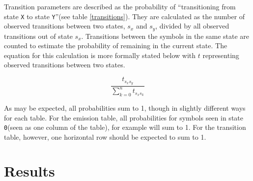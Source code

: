 \documentclass[a4paper,11pt]{article}
\begin{document}
Transition parameters are described as the probability of ``transitioning from state \verb+X+ to state \verb+Y+''(see table \ref{transitions}). They are calculated as the number of observed transitions between two states, $s_x$ and $s_y$, divided by all observed transitions out of state $s_x$. Transitions between the symbols in the same state are counted to estimate the probability of remaining in the current state. The equation for this calculation is more formally stated below with $t$ representing observed transitions between two states.

\begin{equation}
    \frac{t_{s_{x}s_{y}}}{\sum_{k = 0}^{n} t_{s_{x}s_{k}}}
\end{equation}

As may be expected, all probabilities sum to 1, though in slightly different ways for each table. For the emission table, all probabilities for symbols seen in state \verb+0+(seen as one column of the table), for example will sum to 1. For the transition table, however, one horizontal row should be expected to sum to 1.

\section{Results}
\end{document}
